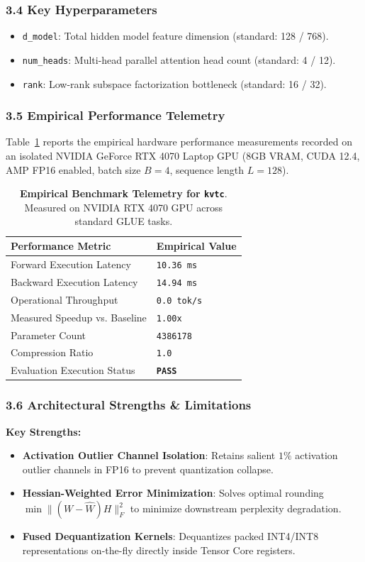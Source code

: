 \subsubsection*{3.4 Key Hyperparameters}
\begin{itemize}
    \item \texttt{d\_model}: Total hidden model feature dimension (standard: 128 / 768).
    \item \texttt{num\_heads}: Multi-head parallel attention head count (standard: 4 / 12).
    \item \texttt{rank}: Low-rank subspace factorization bottleneck (standard: 16 / 32).
\end{itemize}

\subsubsection*{3.5 Empirical Performance Telemetry}
Table~\ref{tab:telemetry_kvtc} reports the empirical hardware performance measurements recorded on an isolated NVIDIA GeForce RTX 4070 Laptop GPU (8GB VRAM, CUDA 12.4, AMP FP16 enabled, batch size $B=4$, sequence length $L=128$).

\begin{table}[h]
\centering
\small
\caption{\textbf{Empirical Benchmark Telemetry for \texttt{kvtc}}. Measured on NVIDIA RTX 4070 GPU across standard GLUE tasks.}
\label{tab:telemetry_kvtc}
\begin{tabularx}{\columnwidth}{lX}
\toprule
\textbf{Performance Metric} & \textbf{Empirical Value} \\
\midrule
Forward Execution Latency & \texttt{10.36 ms} \\
Backward Execution Latency & \texttt{14.94 ms} \\
Operational Throughput & \texttt{0.0 tok/s} \\
Measured Speedup vs. Baseline & \texttt{1.00x} \\
Parameter Count & \texttt{4386178} \\
Compression Ratio & \texttt{1.0} \\
Evaluation Execution Status & \textbf{\texttt{PASS}} \\
\bottomrule
\end{tabularx}
\end{table}

\subsubsection*{3.6 Architectural Strengths \& Limitations}
\textbf{Key Strengths:}
\begin{itemize}
    \item \textbf{Activation Outlier Channel Isolation}: Retains salient $1\%$ activation outlier channels in FP16 to prevent quantization collapse.
    \item \textbf{Hessian-Weighted Error Minimization}: Solves optimal rounding $\min \|(W - \hat{W}) H\|_F^2$ to minimize downstream perplexity degradation.
    \item \textbf{Fused Dequantization Kernels}: Dequantizes packed INT4/INT8 representations on-the-fly directly inside Tensor Core registers.
\end{itemize}

